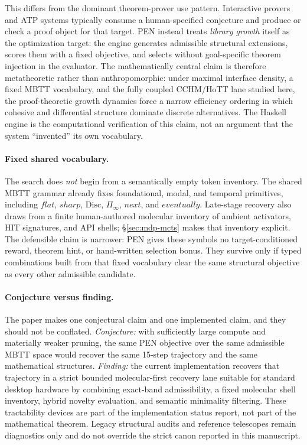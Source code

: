 \documentclass[11pt,a4paper]{article}
\def\flat{flat}%
\def\sharp{sharp}%
\def\bigcirc{next}%
\def\Diamond{eventually}%
\theoremstyle{plain}
\theoremstyle{definition}
\theoremstyle{remark}
\newcommand{\Disc}{\mathrm{Disc}}
\begin{document}
This differs from the dominant theorem-prover use pattern.
Interactive provers and ATP systems typically consume a human-specified conjecture and produce or check a proof object for that target.
PEN instead treats \emph{library growth} itself as the optimization target: the engine generates admissible structural extensions, scores them with a fixed objective, and selects without goal-specific theorem injection in the evaluator.
The mathematically central claim is therefore metatheoretic rather than anthropomorphic: under maximal interface density, a fixed MBTT vocabulary, and the fully coupled CCHM/HoTT lane studied here, the proof-theoretic growth dynamics force a narrow efficiency ordering in which cohesive and differential structure dominate discrete alternatives.
The Haskell engine is the computational verification of this claim, not an argument that the system ``invented'' its own vocabulary.

\paragraph{Fixed shared vocabulary.}
The search does \emph{not} begin from a semantically empty token inventory.
The shared MBTT grammar already fixes foundational, modal, and temporal primitives, including $\flat$, $\sharp$, $\Disc$, $\Pi_{\!\infty}$, $\bigcirc$, and $\Diamond$.
Late-stage recovery also draws from a finite human-authored molecular inventory of ambient activators, HIT signatures, and API shells; \S\ref{sec:mdp-mcts} makes that inventory explicit.
The defensible claim is narrower: PEN gives these symbols no target-conditioned reward, theorem hint, or hand-written selection bonus.
They survive only if typed combinations built from that fixed vocabulary clear the same structural objective as every other admissible candidate.

\paragraph{Conjecture versus finding.}
The paper makes one conjectural claim and one implemented claim, and they should not be conflated.
\emph{Conjecture:} with sufficiently large compute and materially weaker pruning, the same PEN objective over the same admissible MBTT space would recover the same 15-step trajectory and the same mathematical structures.
\emph{Finding:} the current implementation recovers that trajectory in a strict bounded molecular-first recovery lane suitable for standard desktop hardware by combining exact-band admissibility, a fixed molecular shell inventory, hybrid novelty evaluation, and semantic minimality filtering.
These tractability devices are part of the implementation status report, not part of the mathematical theorem.
Legacy structural audits and reference telescopes remain diagnostics only and do not override the strict canon reported in this manuscript.
\end{document}
